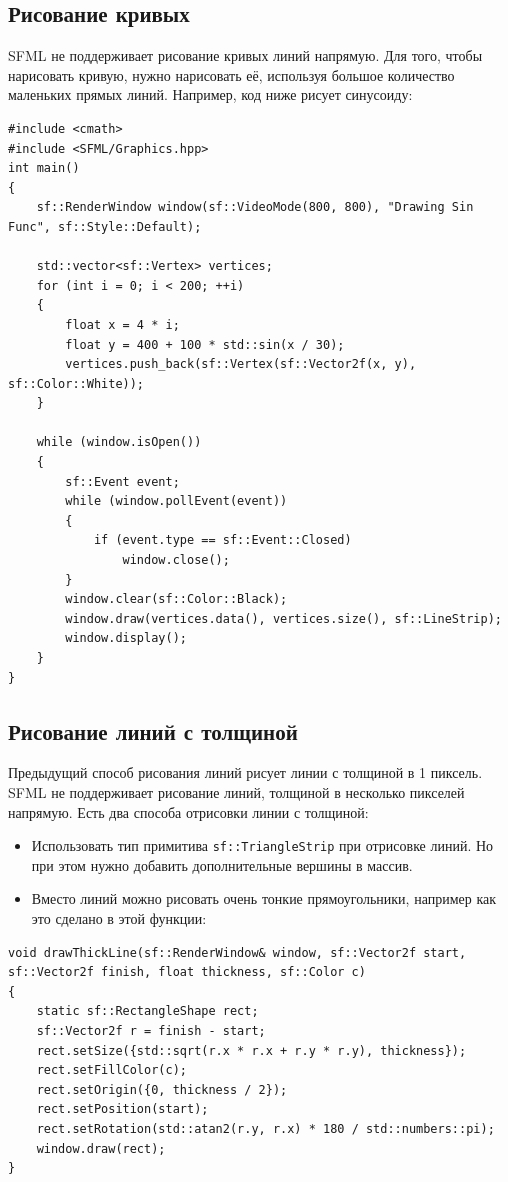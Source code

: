 \documentclass{article}
\begin{document}
\subsection*{Рисование кривых}
SFML не поддерживает рисование кривых линий напрямую. Для того, чтобы нарисовать кривую, нужно нарисовать её, используя большое количество маленьких прямых линий.
Например, код ниже рисует синусоиду:
\begin{lstlisting}
#include <cmath>
#include <SFML/Graphics.hpp>
int main()
{
    sf::RenderWindow window(sf::VideoMode(800, 800), "Drawing Sin Func", sf::Style::Default);
    
    std::vector<sf::Vertex> vertices;
    for (int i = 0; i < 200; ++i)
    {
        float x = 4 * i;
        float y = 400 + 100 * std::sin(x / 30);
        vertices.push_back(sf::Vertex(sf::Vector2f(x, y), sf::Color::White));
    }
    
    while (window.isOpen())
    {
        sf::Event event;
        while (window.pollEvent(event)) 
        {
            if (event.type == sf::Event::Closed)
                window.close();
        }
        window.clear(sf::Color::Black);
        window.draw(vertices.data(), vertices.size(), sf::LineStrip);
        window.display();
    }
}
\end{lstlisting}


\subsection*{Рисование линий с толщиной}
Предыдущий способ рисования линий рисует линии с толщиной в 1 пиксель. SFML не поддерживает рисование линий, толщиной в несколько пикселей напрямую. Есть два способа отрисовки линии с толщиной:
\begin{itemize}
\item Использовать тип примитива \texttt{sf::TriangleStrip} при отрисовке линий. Но при этом нужно добавить дополнительные вершины в массив.
\item Вместо линий можно рисовать очень тонкие прямоугольники, например как это сделано в этой функции:
\end{itemize} 
\begin{lstlisting}
void drawThickLine(sf::RenderWindow& window, sf::Vector2f start, sf::Vector2f finish, float thickness, sf::Color c)
{
    static sf::RectangleShape rect;
    sf::Vector2f r = finish - start;
    rect.setSize({std::sqrt(r.x * r.x + r.y * r.y), thickness});
    rect.setFillColor(c);
    rect.setOrigin({0, thickness / 2});
    rect.setPosition(start);
    rect.setRotation(std::atan2(r.y, r.x) * 180 / std::numbers::pi);
    window.draw(rect);
}
\end{lstlisting}
\end{document}
